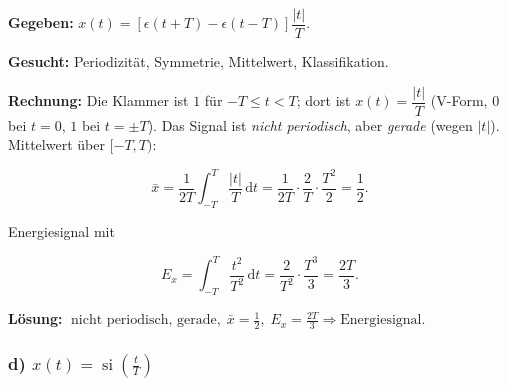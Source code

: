 \begin{beispiel}

\textbf{Gegeben:} $x(t) = \left[\epsilon(t+T) - \epsilon(t-T)\right]\dfrac{|t|}{T}$.

\textbf{Gesucht:} Periodizität, Symmetrie, Mittelwert, Klassifikation.

\textbf{Rechnung:} Die Klammer ist $1$ für $-T \leq t < T$; dort ist
$x(t) = \dfrac{|t|}{T}$ (V-Form, $0$ bei $t = 0$, $1$ bei $t = \pm T$). Das
Signal ist \emph{nicht periodisch}, aber \emph{gerade} (wegen $|t|$).
Mittelwert über $[-T, T)$:

$$
\bar{x} = \frac{1}{2T}\int_{-T}^{T} \frac{|t|}{T}\,\mathrm{d}t
        = \frac{1}{2T}\cdot\frac{2}{T}\cdot\frac{T^2}{2} = \frac{1}{2}.
$$

Energiesignal mit

$$
E_x = \int_{-T}^{T} \frac{t^2}{T^2}\,\mathrm{d}t
    = \frac{2}{T^2}\cdot\frac{T^3}{3} = \frac{2T}{3}.
$$

\begin{center}
\end{center}

\textbf{Lösung:}
$\boxed{\;\text{nicht periodisch, gerade},\; \bar{x} = \tfrac12,\;
E_x = \tfrac{2T}{3} \Rightarrow \text{Energiesignal.}\;}$

\end{beispiel}

\subsubsection*{d) $x(t) = \operatorname{si}\!\left(\frac{t}{T}\right)$}

